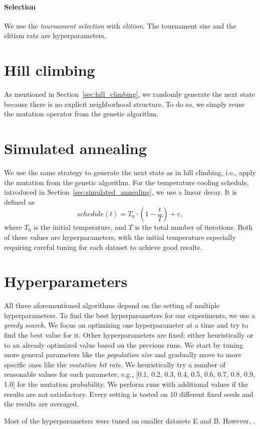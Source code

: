 \paragraph{Selection}

We use the \textit{tournament selection} with \textit{elitism}. The tournament size and the elitism rate are hyperparameters.

\section{Hill climbing}

As mentioned in Section~\ref{sec:hill_climbing}, we randomly generate the next state because there is no explicit neighborhood structure. To do so, we simply reuse the mutation operator from the genetic algorithm.

\section{Simulated annealing}

We use the same strategy to generate the next state as in hill climbing, i.e., apply the mutation from the genetic algorithm. For the temperature cooling schedule, introduced in Section~\ref{sec:simulated_annealing}, we use a linear decay. It is defined as
\begin{equation}
    schedule(t) = T_0 \cdot \left(1 - \frac{t}{T}\right) + \varepsilon,
\end{equation}
where $T_0$ is the initial temperature, and $T$ is the total number of iterations. Both of these values are hyperparameters, with the initial temperature especially requiring careful tuning for each dataset to achieve good results.
\section{Hyperparameters}

All three aforementioned algorithms depend on the setting of multiple hyperparameters. To find the best hyperparameters for our experiments, we use a \textit{greedy search}. We focus on optimizing one hyperparameter at a time and try to find the best value for it. Other hyperparameters are fixed; either heuristically or to an already optimized value based on the previous runs. We start by tuning more general parameters like the \textit{population size} and gradually move to more specific ones like the \textit{mutation bit rate}. We heuristically try a number of reasonable values for each parameter, e.g., [0.1, 0.2, 0.3, 0.4, 0.5, 0.6, 0.7, 0.8, 0.9, 1.0] for the mutation probability. We perform runs with additional values if the results are not satisfactory. Every setting is tested on 10 different fixed seeds and the results are averaged.

Most of the hyperparameters were tuned on smaller datasets E and B. However, .

